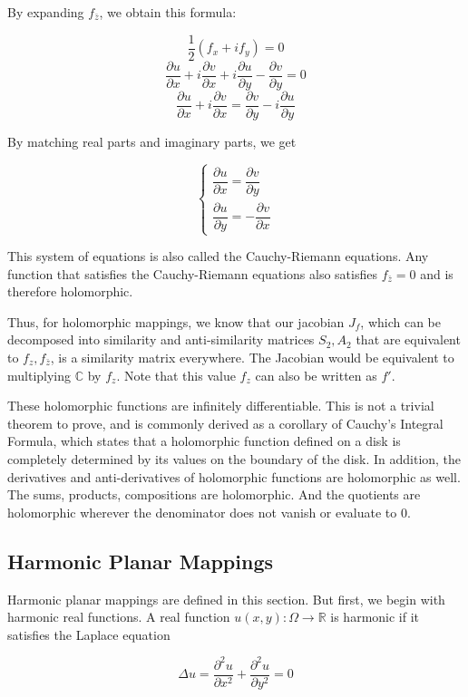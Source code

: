 By expanding $f_{\bar{z}}$, we obtain this formula:

$$\frac{1}{2} (f_x + i f_y) = 0$$
$$\frac{\partial u}{\partial x} + i \frac{\partial v}{\partial x} + i \frac{\partial u}{\partial y} - \frac{\partial v}{\partial y} = 0$$
$$\frac{\partial u}{\partial x} + i \frac{\partial v}{\partial x} = \frac{\partial v}{\partial y} - i \frac{\partial u}{\partial y} $$

By matching real parts and imaginary parts, we get

$$\begin{cases}
\dfrac{\partial u}{\partial x} = \dfrac{\partial v}{\partial y} \\
\dfrac{\partial u}{\partial y} = - \dfrac{\partial v}{\partial x}
\end{cases}$$

This system of equations is also called the Cauchy-Riemann equations. Any function that satisfies the Cauchy-Riemann equations also satisfies $f_{\bar{z}} = 0$ and is therefore holomorphic.


Thus, for holomorphic mappings, we know that our jacobian $J_f$, which can be decomposed into similarity and anti-similarity matrices $S_2, A_2$ that are equivalent to $f_z, f_{\bar{z}}$, is a similarity matrix everywhere. The Jacobian would be equivalent to multiplying $\mathbb{C}$ by $f_z$. Note that this value $f_z$ can also be written as $f'$. 

These holomorphic functions are infinitely differentiable. This is not a trivial theorem to prove, and is commonly derived as a corollary of Cauchy's Integral Formula, which states that a holomorphic function defined on a disk is completely determined by its values on the boundary of the disk. In addition, the derivatives and anti-derivatives of holomorphic functions are holomorphic as well. The sums, products, compositions are holomorphic. And the quotients are holomorphic wherever the denominator does not vanish or evaluate to 0.


\subsection{Harmonic Planar Mappings}

Harmonic planar mappings are defined in this section. But first, we begin with harmonic real functions. A real function $u(x,y) : \Omega \rightarrow \mathbb{R}$ is harmonic if it satisfies the Laplace equation

$$\Delta u = \frac{\partial^2 u}{\partial x^2} + \frac{\partial^2 u}{\partial y^2} = 0$$

